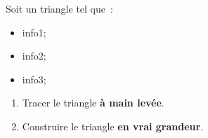 \documentclass[exercice]{thedocument}%
\begin{document}
%
    Soit  un triangle tel que~:
    \begin{itemize}
        \item \<info1;
        \item \<info2;
        \item \<info3;
    \end{itemize}
    \begin{enumerate}
        \item Tracer le triangle \textbf{à main levée}.
        \item Construire le triangle \textbf{en vrai grandeur}.
    \end{enumerate}
\end{document}
